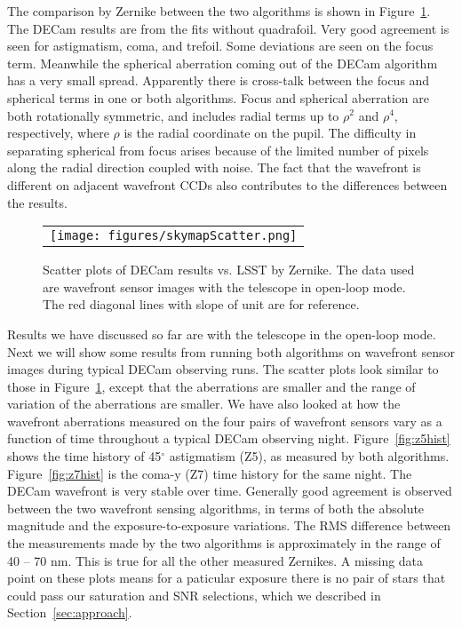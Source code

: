 \documentclass[]{spie}  %
\begin{document}
The comparison by Zernike between the two algorithms is shown in
Figure~\ref{fig:skymapScatter}. The DECam results are from the fits without quadrafoil. 
Very good agreement is seen for astigmatism, coma, and trefoil.
Some deviations are seen on the focus term.
Meanwhile the spherical aberration coming out of the DECam algorithm has a very small spread.
Apparently there is cross-talk between the focus and spherical terms in one or both algorithms.
Focus and spherical aberration are both rotationally symmetric, and includes radial terms up to $\rho^2$ and $\rho^4$, respectively, where $\rho$ is the radial coordinate on the pupil. 
The difficulty in separating spherical from focus arises because of the limited number of pixels along the radial direction coupled with noise.
The fact that the wavefront is different on adjacent wavefront CCDs also contributes to the differences between the results.

   \begin{figure} [tphb]
   \begin{center}
   \begin{tabular}{c} %
   \texttt{[image: figures/skymapScatter.png]}
   \end{tabular}
   \end{center}
   \caption[example] 
   { \label{fig:skymapScatter} 
Scatter plots of DECam results vs. LSST by Zernike. The data used are wavefront sensor images with the telescope in open-loop mode. The red diagonal lines with slope of unit are for reference.
}
   \end{figure} 

Results we have discussed so far are with the telescope in the open-loop mode.
Next we will show some results from running both algorithms on wavefront sensor images during typical DECam observing runs. The scatter plots look similar to those in Figure~\ref{fig:skymapScatter}, except that
the aberrations are smaller and 
the range of variation of the aberrations are smaller.
We have also looked at how the wavefront aberrations measured on the four pairs of wavefront sensors vary
as a function of time throughout a typical DECam observing night.
Figure~\ref{fig:z5hist} shows the time history of 45$^\circ$ astigmatism (Z5), as measured by both algorithms.
Figure~\ref{fig:z7hist} is the coma-y (Z7) time history for the same night.
The DECam wavefront is very stable over time.
Generally good agreement is observed between the two wavefront sensing algorithms, in terms of both the absolute magnitude and the exposure-to-exposure variations.
The RMS difference between the measurements made by the two algorithms is approximately in the range of 40 -- 70 nm. This is true for all the other measured Zernikes.
A missing data point on these plots means for a paticular exposure there is no pair of stars that could pass our saturation and SNR selections, which we described in Section~\ref{sec:approach}.
\end{document}
